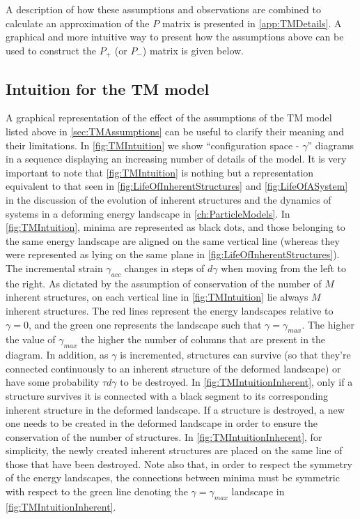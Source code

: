 A description of how these assumptions and observations are combined to calculate an approximation of the $P$ matrix is presented in \autoref{app:TMDetails}.
A graphical and more intuitive way to present how the assumptions above can be used to construct the $P_{+}$ (or $P_{-}$) matrix is given below.

\subsection{Intuition for the TM model}

A graphical representation of the effect of the assumptions of the TM model listed above in \autoref{sec:TMAssumptions} can be useful to clarify their meaning and their limitations. In \autoref{fig:TMIntuition} we show ``configuration space - $\gamma$'' diagrams in a sequence displaying an increasing number of details of the model. It is very important to note that \autoref{fig:TMIntuition} is nothing but a representation equivalent to that seen in \autoref{fig:LifeOfInherentStructures} and \autoref{fig:LifeOfASystem} in the discussion of the evolution of inherent structures and the dynamics of systems in a deforming energy landscape in \autoref{ch:ParticleModels}.
In \autoref{fig:TMIntuition}, minima are represented as black dots, and those belonging to the same energy landscape are aligned on the same vertical line (whereas they were represented as lying on the same plane in \autoref{fig:LifeOfInherentStructures}). The incremental strain $\gamma_{acc}$ changes in steps of $d\gamma$ when moving from the left to the right. As dictated by the assumption of conservation of the number of $M$ inherent structures, on each vertical line in \autoref{fig:TMIntuition} lie always $M$ inherent structures. The red lines represent the energy landscapes relative to $\gamma = 0$, and the green one represents the landscape such that $\gamma = \gamma_{max}$. The higher the value of $\gamma_{max}$ the higher the number of columns that are present in the diagram.
In addition, as $\gamma$ is incremented, structures can survive (so that they're connected continuously to an inherent structure of the deformed landscape) or have some probability $\tau d\gamma$ to be destroyed. In \autoref{fig:TMIntuitionInherent}, only if a structure survives it is connected with a black segment to its corresponding inherent structure in the deformed landscape. If a structure is destroyed, a new one needs to be created in the deformed landscape in order to ensure the conservation of the number of structures. In \autoref{fig:TMIntuitionInherent}, for simplicity, the newly created inherent structures are placed on the same line of those that have been destroyed. Note also that, in order to respect the symmetry of the energy landscapes, the connections between minima must be symmetric with respect to the green line denoting the $\gamma = \gamma_{max}$ landscape in \autoref{fig:TMIntuitionInherent}.
